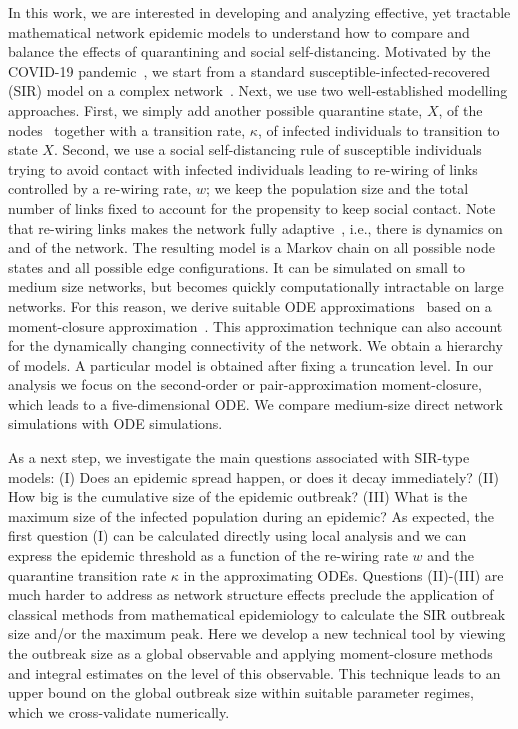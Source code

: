 \documentclass[12pt]{article}
\begin{document}
In this work, we are interested in developing and analyzing effective, yet tractable mathematical network epidemic models to understand how to compare and balance the effects of quarantining and social self-distancing. Motivated by the COVID-19 pandemic~\cite{ThurnerKlimekHanel}, we start from a standard susceptible-infected-recovered (SIR) model on a complex network~\cite{KissMillerSimon}. Next, we use two well-established modelling approaches. First, we simply add another possible quarantine state, $X$, of the nodes~\cite{MaierBrockmann,Peaketal} together with a transition rate, $\kappa$, of infected individuals to transition to state $X$. Second, we use a social self-distancing rule of susceptible individuals trying to avoid contact with infected individuals leading to re-wiring of links~\cite{GrossDLimaBlasius,ShawSchwartz,Risau-GusmanZanette} controlled by a re-wiring rate, $w$; we keep the population size and the total number of links fixed to account for the propensity to keep social contact. Note that re-wiring links makes the network fully adaptive~\cite{GrossSayama}, i.e., there is dynamics on and of the network. The resulting model is a Markov chain on all possible node states and all possible edge configurations. It can be simulated on small to medium size networks, but becomes quickly computationally intractable on large networks. For this reason, we derive suitable ODE approximations~\cite{KissMillerSimon} based on a moment-closure approximation~\cite{Keeling,KeelingRandMorris,GrossDLimaBlasius,KuehnMC}. This approximation technique can also account for the dynamically changing connectivity of the network. We obtain a hierarchy of models. A particular model is obtained after fixing a truncation level. In our analysis we focus on the second-order or pair-approximation moment-closure, which leads to a five-dimensional ODE. We compare medium-size direct network simulations with ODE simulations. 

As a next step, we investigate the main questions associated with SIR-type models: (I)
Does an epidemic spread happen, or does it  decay immediately? (II) How big is the cumulative size of the epidemic outbreak? (III) What is the maximum size of the infected population during an epidemic? As expected, the first question (I) can be calculated directly using local analysis and we can express the epidemic threshold as a function of the re-wiring rate $w$ and the quarantine transition rate $\kappa$ in the approximating ODEs. Questions (II)-(III) are much harder to address as network structure effects preclude the application of classical methods from mathematical epidemiology to calculate the SIR outbreak size and/or the maximum peak. Here we develop a new technical tool by viewing the outbreak size as a global observable and applying moment-closure methods and integral estimates on the level of this observable. This technique leads to an upper bound on the global outbreak size within suitable parameter regimes, which we cross-validate numerically. 
\end{document}
